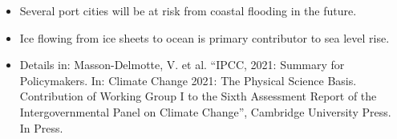 \documentclass[10pt,final,xcolor=dvipsnames]{beamer}
\begin{document}
\begin{frame}
  
 \vspace{0.1in}
 \begin{itemize}
 \item Several port cities will be at risk from coastal
   flooding in the future.
 \item Ice flowing from ice sheets to ocean is primary contributor
   to sea level rise.
 \end{itemize}

 \begin{itemize}
  \item [] \scriptsize{Details in: Masson-Delmotte, V. et al. ``IPCC,
    2021: Summary for Policymakers. In: Climate Change 2021: The
    Physical Science Basis. Contribution of Working Group I to the
    Sixth Assessment Report of the Intergovernmental Panel on Climate
    Change'', Cambridge University Press. In Press.}
  \end{itemize}

 
 
\end{frame}
\end{document}
